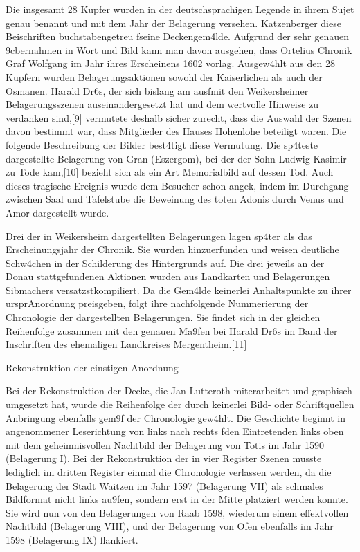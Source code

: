\documentclass[
  letterpaper,
]{book}
\begin{document}
Die insgesamt 28 Kupfer wurden in der deutschsprachigen Legende in ihrem
Sujet genau benannt und mit dem Jahr der Belagerung versehen.
Katzenberger \xbcbernahm diese Beischriften buchstabengetreu
f\xbcr seine Deckengem\xa4lde. Aufgrund der sehr genauen
\x9cbernahmen in Wort und Bild kann man davon ausgehen, dass
Ortelius Chronik Graf Wolfgang im Jahr ihres Erscheinens
1602 vorlag. Ausgew\xa4hlt aus den 28 Kupfern wurden
Belagerungsaktionen sowohl der Kaiserlichen als auch der Osmanen. Harald
Dr\xb6s, der sich bislang am ausf\xbchrlichsten mit den
Weikersheimer Belagerungsszenen auseinandergesetzt hat und dem wertvolle
Hinweise zu verdanken sind,{[}9{]} vermutete deshalb sicher zurecht,
dass die Auswahl der Szenen davon bestimmt war, dass Mitglieder des
Hauses Hohenlohe beteiligt waren. Die folgende Beschreibung der Bilder
best\xa4tigt diese Vermutung. Die sp\xa4teste dargestellte
Belagerung von Gran (Eszergom), bei der der Sohn Ludwig Kasimir zu Tode
kam,{[}10{]} bezieht sich als ein Art Memorialbild auf dessen Tod. Auch
dieses tragische Ereignis wurde dem Besucher schon angek\xbcndigt,
indem im Durchgang zwischen Saal und Tafelstube die Beweinung des toten
Adonis durch Venus und Amor dargestellt wurde.

Drei der in Weikersheim dargestellten Belagerungen lagen sp\xa4ter
als das Erscheinungsjahr der Chronik. Sie wurden hinzuerfunden und
weisen deutliche Schw\xa4chen in der Schilderung des Hintergrunds
auf. Die drei jeweils an der Donau stattgefundenen Aktionen wurden aus
Landkarten und Belagerungen Sibmachers
versatzst\xbcckhaft kompiliert. Da die Gem\xa4lde keinerlei
Anhaltspunkte zu ihrer urspr\xbcnglichen Anordnung preisgeben, folgt
ihre nachfolgende Nummerierung der Chronologie der dargestellten
Belagerungen. Sie findet sich in der gleichen Reihenfolge zusammen mit
den genauen Ma\x9fen bei Harald Dr\xb6s im Band der Inschriften
des ehemaligen Landkreises Mergentheim.{[}11{]}

Rekonstruktion der einstigen Anordnung

Bei der Rekonstruktion der Decke, die Jan Lutteroth miterarbeitet und
graphisch umgesetzt hat, wurde die Reihenfolge der durch keinerlei Bild-
oder Schriftquellen \xbcberlieferten Anbringung ebenfalls
gem\x9f der Chronologie gew\xa4hlt. Die Geschichte
beginnt in angenommener Leserichtung von links nach rechts
f\xbcr den Eintretenden links oben mit dem geheimnisvollen Nachtbild
der Belagerung von Totis im Jahr 1590 (Belagerung I). Bei der
Rekonstruktion der in vier Register \xbcbereinanderliegenden Szenen
musste lediglich im dritten Register einmal die Chronologie verlassen
werden, da die Belagerung der Stadt Waitzen im Jahr 1597 (Belagerung
VII) als schmales Bildformat nicht links au\x9fen, sondern erst in
der Mitte platziert werden konnte. Sie wird nun von den Belagerungen von
Raab 1598, wiederum einem effektvollen Nachtbild (Belagerung VIII), und
der Belagerung von Ofen ebenfalls im Jahr 1598 (Belagerung IX)
flankiert.
\end{document}
